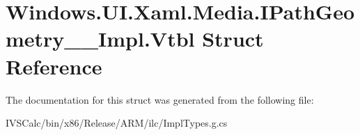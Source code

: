 \hypertarget{struct_windows_1_1_u_i_1_1_xaml_1_1_media_1_1_i_path_geometry_____impl_1_1_vtbl}{}\section{Windows.\+U\+I.\+Xaml.\+Media.\+I\+Path\+Geometry\+\_\+\+\_\+\+Impl.\+Vtbl Struct Reference}
\label{struct_windows_1_1_u_i_1_1_xaml_1_1_media_1_1_i_path_geometry_____impl_1_1_vtbl}


The documentation for this struct was generated from the following file\+:\begin{DoxyCompactItemize}
\item 
I\+V\+S\+Calc/bin/x86/\+Release/\+A\+R\+M/ilc/Impl\+Types.\+g.\+cs\end{DoxyCompactItemize}
